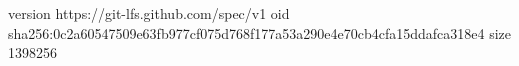 version https://git-lfs.github.com/spec/v1
oid sha256:0c2a60547509e63fb977cf075d768f177a53a290e4e70cb4cfa15ddafca318e4
size 1398256
